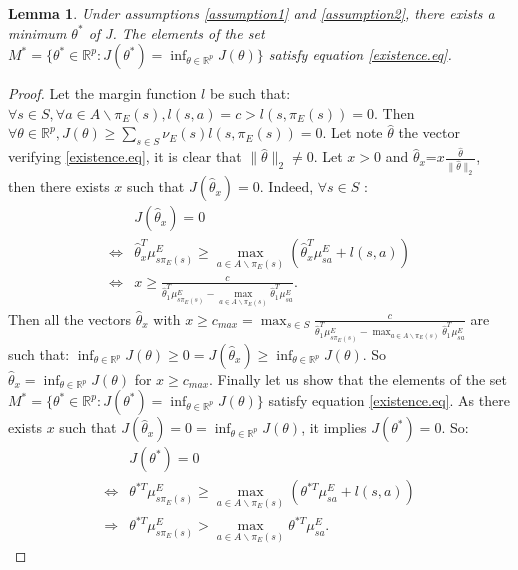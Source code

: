 \documentclass{article}
\newtheorem{lemme}{Lemma}
\begin{document}
\begin{lemme}
\label{proposition1} Under assumptions \ref{assumption1} and
\ref{assumption2}, there exists a minimum $\theta^*$ of J. The
elements of the set $M^*=\{\theta^*\in\mathbb{R}^p:
J(\theta^*)=\inf_{\theta\in\mathbb{R}^p}J(\theta)\}$ satisfy
equation \eqref{existence.eq}.
\end{lemme}
\begin{proof}
Let the margin function $l$ be such that: $\forall s\in S, \forall
a\in A\backslash\pi_E(s), l(s,a)=c>l(s,\pi_E(s))=0$. Then $\forall
\theta\in\mathbb{R}^p,J(\theta)\geq\sum_{s\in
S}\nu_E(s)l(s,\pi_E(s))=0$. Let note $\hat{\theta}$ the vector
verifying \eqref{existence.eq}, it is clear that
$\|\hat{\theta}\|_2\neq0$. Let $x>0$ and
$\hat{\theta}_x$=$x\frac{\hat{\theta}}{\|\hat{\theta}\|_2}$, then
there exists $x$ such that $J(\hat{\theta}_x)=0$. Indeed, $\forall
s\in S$ :
\begin{align}
&J(\hat{\theta}_x)=0\\
\Leftrightarrow&\hat{\theta}_x^T\mu^E_{s\pi_E(s)}\geq\max_{a \in A\backslash\pi_E(s)}(\hat{\theta}_x^T\mu^E_{sa}+l(s,a))\\
\Leftrightarrow&x\geq\frac{c}{\hat{\theta}_1^T\mu^E_{s\pi_E(s)}-\max_{a \in A\backslash\pi_E(s)}\hat{\theta}_1^T\mu^E_{sa}}.
\end{align}
Then all the vectors $\hat{\theta}_x$ with $x\geq c_{max}=\max_{s\in
S}\frac{c}{\hat{\theta}_1^T\mu^E_{s\pi_E(s)}-\max_{a \in
A\backslash\pi_E(s)}\hat{\theta}_1^T\mu^E_{sa}}$ are such that:
$\inf_{\theta\in\mathbb{R}^p}J(\theta)\geq0=J(\hat{\theta}_x)\geq\inf_{\theta\in\mathbb{R}^p}J(\theta)$.
So $\hat{\theta}_x=\inf_{\theta\in\mathbb{R}^p}J(\theta)$ for $x\geq
c_{max}$. Finally let us show that the elements of the set
$M^*=\{\theta^*\in\mathbb{R}^p:
J(\theta^*)=\inf_{\theta\in\mathbb{R}^p}J(\theta)\}$ satisfy
equation \eqref{existence.eq}. As there exists $x$ such that
$J(\hat{\theta}_x)=0=\inf_{\theta\in\mathbb{R}^p}J(\theta)$, it
implies $J(\theta^*)=0$. So:
\begin{align}
&J(\theta^*)=0\\
\Leftrightarrow&\theta^{*T}\mu^E_{s\pi_E(s)}\geq\max_{a \in A\backslash\pi_E(s)}(\theta^{*T}\mu^E_{sa}+l(s,a))\\
\Rightarrow&\theta^{*T}\mu^E_{s\pi_E(s)}>\max_{a \in A\backslash\pi_E(s)}\theta^{*T}\mu^E_{sa}.
\end{align}
\end{proof}
\end{document}

